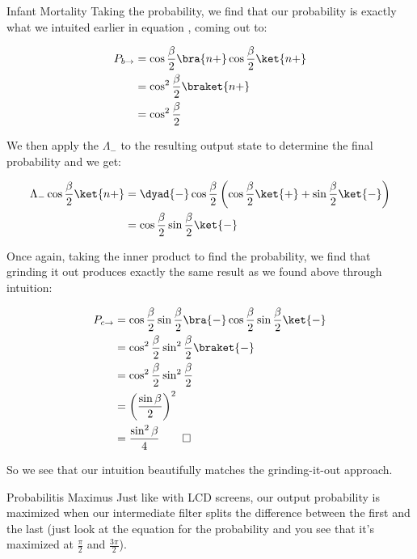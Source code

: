 \begin{answer}
\begin{answerpart}{Infant Mortality}
    Taking the probability, we find that our probability is exactly
    what we intuited earlier in equation , coming
    out to:

    \begin{equation}
      \begin{split}
        P_{b \rightarrow}
        &= \cos{\frac{\beta}{2}}\bra{n+}\cos{\frac{\beta}{2}}\ket{n+}\\
        &= \cos^2{\frac{\beta}{2}}\braket{n+}\\
        &= \cos^2{\frac{\beta}{2}}\\
      \end{split}
    \end{equation}

    We then apply the $\Lambda_{-}$ to the resulting output state to
    determine the final probability and we get:

    \begin{equation}
      \begin{split}
        \Lambda_{-}\cos{\frac{\beta}{2}}\ket{n+}
        &= \dyad{-}\cos{\frac{\beta}{2}}
        \left(\cos{\frac{\beta}{2}} \ket{+}
        + \sin{\frac{\beta}{2}} \ket{-}\right)\\
        &= \cos{\frac{\beta}{2}}\sin{\frac{\beta}{2}}\ket{-}\\
      \end{split}
    \end{equation}

    Once again, taking the inner product to find the probability, we
    find that grinding it out produces exactly the same result as we
    found above through intuition:

    \begin{equation}
      \begin{split}
        P_{c \rightarrow}
        &= \cos{\frac{\beta}{2}}\sin{\frac{\beta}{2}}\bra{-}\cos{\frac{\beta}{2}}\sin{\frac{\beta}{2}}\ket{-}\\
        &= \cos^2{\frac{\beta}{2}}\sin^2{\frac{\beta}{2}}\braket{-}\\
        &= \cos^2{\frac{\beta}{2}}\sin^2{\frac{\beta}{2}}\\
        &= \left(\frac{\sin{\beta}}{2}\right)^2\\
        &= \frac{\sin^2{\beta}}{4}\qed\\
      \end{split}
    \end{equation}

    So we see that our intuition beautifully matches the
    grinding-it-out approach.
    
  \end{answerpart}

  \begin{answerpart}{Probabilitis Maximus}
    Just like with LCD screens, our output probability is maximized
    when our intermediate filter splits the difference between the
    first and the last (just look at the equation for the probability
    and you see that it's maximized at $\frac{\pi}{2}$ and
    $\frac{3\pi}{2}$).
  \end{answerpart}

\end{answer}
